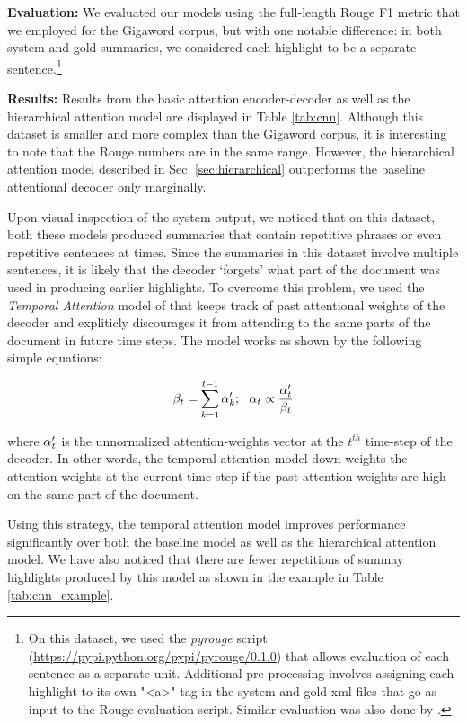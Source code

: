{\bf Evaluation:} We evaluated our models using the full-length Rouge F1 metric that we employed for the Gigaword corpus, but with one notable difference: in both system and gold summaries, we considered each highlight to be a separate sentence.\footnote{On this dataset, we used the {\it pyrouge} script (\url{https://pypi.python.org/pypi/pyrouge/0.1.0}) that allows evaluation of each sentence as a separate unit. Additional pre-processing involves assigning each highlight to its own "<a>" tag in the system and gold xml files that go as input to the Rouge evaluation script. Similar evaluation was also done by \cite{jianpeng}.}

{\bf Results:} Results from the basic attention encoder-decoder as well as the hierarchical attention model are displayed in Table \ref{tab:cnn}. Although this dataset is smaller and more complex than the Gigaword corpus, it is interesting to note that the Rouge numbers are in the same range. However, the hierarchical attention model described in Sec. \ref{sec:hierarchical} outperforms  the baseline attentional decoder only marginally. 

Upon visual inspection of the system output, we noticed that on this dataset, both these models  produced summaries that contain repetitive phrases or even repetitive sentences at times. Since the summaries in this dataset involve multiple sentences, it is likely that the decoder `forgets' what part of the document was used in producing earlier highlights. To overcome this problem, we used the {\it Temporal Attention} model of  that keeps track of past attentional weights of the decoder and expliticly discourages it from attending to the same parts of the document in future time steps. The model works as shown by the following simple equations:

\begin{equation}
{\bf \beta}_t = \sum_{k=1}^{t-1}{\bf \alpha}_k';~~ {\bf \alpha}_t \propto \frac{{\bf \alpha}'_t}{{\bf \beta}_t} \nonumber
\end{equation}

where ${\bf \alpha}'_t$ is the unnormalized attention-weights vector at the $t^{th}$ time-step of the decoder. In other words, the temporal attention model down-weights the attention weights at the current time step if the past attention weights are high on the same part of the document. 

Using this strategy, the temporal attention model improves performance significantly over both the baseline model as well as the hierarchical attention model. We have also noticed that there are fewer repetitions of summay highlights produced by this model as shown in the example in Table \ref{tab:cnn_example}.

